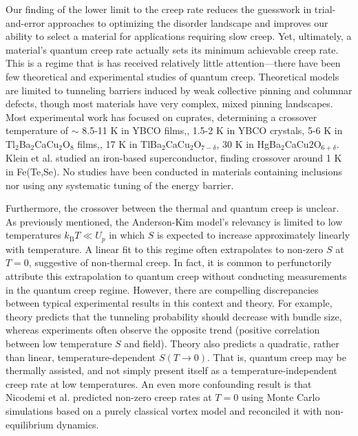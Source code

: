 \documentclass[%
 aip,
 amsmath,amssymb,
 reprint,%
floatfix]{revtex4-1}
\newcommand{\kB}{k_{\mathrm{B}}}
\begin{document}
Our finding of the lower limit to the creep rate reduces the guesswork in trial-and-error approaches to optimizing the disorder landscape and improves our ability to select a material for applications requiring slow creep. Yet, ultimately, a material's quantum creep rate actually sets its minimum achievable creep rate.  This is a regime that is has received relatively little attention---there have been few theoretical and experimental studies of quantum creep. Theoretical models are limited to tunneling barriers induced by weak collective pinning\cite{Blatter1991, PhysRevB.47.2725} and columnar defects,\cite{PhysRevB.51.1181} though most materials have very complex, mixed pinning landscapes. Most experimental work has focused on cuprates, determining a crossover temperature of $\sim$ 8.5-11 K in YBCO films,\cite{PhysRevB.64.094509, LANDAU2000251, Luo_2002}, 1.5-2 K in YBCO crystals,\cite{PhysRevB.59.7222, LANDAU2000251} 5-6 K in Tl$_2$Ba$_2$CaCu$_2$O$_8$ films,\cite{PhysRevB.59.7222, PhysRevB.47.11552}, 17 K in TlBa$_2$CaCu$_2$O$_{7-\delta}$,\cite{PhysRevB.64.094509} 30 K in HgBa$_2$CaCu$2$O$_{6+\delta}$.\cite{PhysRevB.64.094509} Klein et al.\cite{PhysRevB.89.014514} studied an iron-based superconductor, finding crossover around 1 K in Fe(Te,Se).   No studies have been conducted in materials containing inclusions nor using any systematic tuning of the energy barrier.


Furthermore, the crossover between the thermal and quantum creep is unclear. As previously mentioned, the Anderson-Kim model's relevancy is limited to low temperatures $\kB T \ll U_{p}$ in which $S$ is expected to increase approximately linearly with temperature. A linear fit to this regime often extrapolates to non-zero $S$ at $T = 0$, suggestive of non-thermal creep. In fact, it is common to perfunctorily attribute this extrapolation to quantum creep without conducting measurements in the quantum creep regime. However, there are compelling discrepancies between typical experimental results in this context and theory. For example, theory predicts that the tunneling probability should decrease with bundle size, whereas experiments often observe the opposite trend (positive correlation between low temperature $S$ and field)\cite{Lykov2013}. Theory also predicts a quadratic, rather than linear, temperature-dependent $S(T \rightarrow 0)$\cite{Lykov2013, PhysRevB.59.7222}. That is, quantum creep may be thermally assisted\cite{Blatter1991}, and not simply present itself as a temperature-independent creep rate at low temperatures. An even more confounding result is that Nicodemi et al.\cite{PhysRevLett.86.4378} predicted non-zero creep rates at $T = 0$ using Monte Carlo simulations based on a purely classical vortex model and reconciled it with non-equilibrium dynamics.
\end{document}
